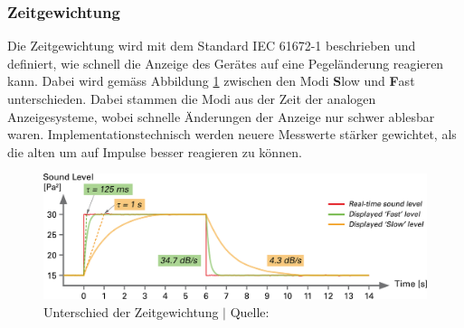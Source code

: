 \documentclass[12pt]{article}
\begin{document}
	\subsubsection*{Zeitgewichtung} \label{Zeitgewichtung}
	Die Zeitgewichtung wird mit dem Standard IEC 61672-1 beschrieben und definiert, wie schnell die Anzeige des Gerätes auf eine Pegeländerung reagieren kann. Dabei wird gemäss Abbildung \ref{fig:batf-s-time-weighting} zwischen den Modi \textbf{S}low und \textbf{F}ast unterschieden. Dabei stammen die Modi aus der Zeit der analogen Anzeigesysteme, wobei schnelle Änderungen der Anzeige nur schwer ablesbar waren. Implementationstechnisch werden neuere Messwerte stärker gewichtet, als die alten um auf Impulse besser reagieren zu können.
	\begin{figure}[H]
		\centering
		\includegraphics[width=1\linewidth]{images/BAT_F-S-time-weighting}
		\caption{Unterschied der Zeitgewichtung $\vert$ Quelle: \cite{noauthor_was_nodate}}
		\label{fig:batf-s-time-weighting}
	\end{figure}
	
\end{document}
